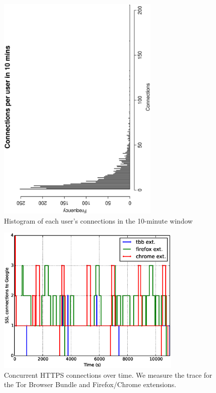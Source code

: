 \documentclass[conference]{IEEEtran}
\begin{document}
\begin{figure}
\centering
\includegraphics[width=0.7\textwidth, angle=270]{figs/connections-google.eps}
\caption{Histogram of each user's connections in the 10-minute window}
\label{fig:connections}
\end{figure}
\begin{figure}
\centering
\includegraphics[width=0.8\textwidth]{figs/conns.eps}
\caption{Concurrent HTTPS connections over time. We measure the trace for the Tor Browser Bundle and Firefox/Chrome extensions.}
\label{fig:conconns}
\end{figure}
\end{document}
